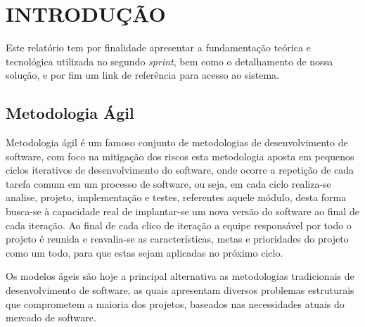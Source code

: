 \documentclass{abnt}
\begin{document}





\capa

\folhaderosto

\tableofcontents


\chapter{INTRODUÇÃO}

	Este relatório tem por finalidade apresentar a fundamentação teórica e tecnológica utilizada no segundo \emph{sprint}, bem como o detalhamento de nossa solução, e por fim um link de referência para acesso ao sistema.


	
	\section{Metodologia Ágil}
	
		Metodologia ágil é um famoso conjunto de metodologias de desenvolvimento de software, 
		com foco na mitigação dos riscos esta metodologia aposta em pequenos ciclos iterativos de desenvolvimento do software,
		onde ocorre a repetição de cada tarefa comum em um processo de software, ou seja, em cada ciclo realiza-se analise, projeto,
		implementação e testes, referentes aquele módulo, desta forma busca-se à capacidade real de implantar-se um nova versão 
		do software ao final de cada iteração. Ao final de cada clico de iteração a equipe responsável por todo o projeto é reunida 
		e reavalia-se as características, metas e prioridades do projeto como um todo, para que estas sejam aplicadas no próximo ciclo.
		
		Os modelos ágeis são hoje a principal alternativa as metodologias tradicionais de desenvolvimento de software, 
		as quais apresentam diversos problemas estruturais que comprometem a maioria dos projetos, 
		baseados nas necessidades atuais do mercado de software.
	
\end{document}
